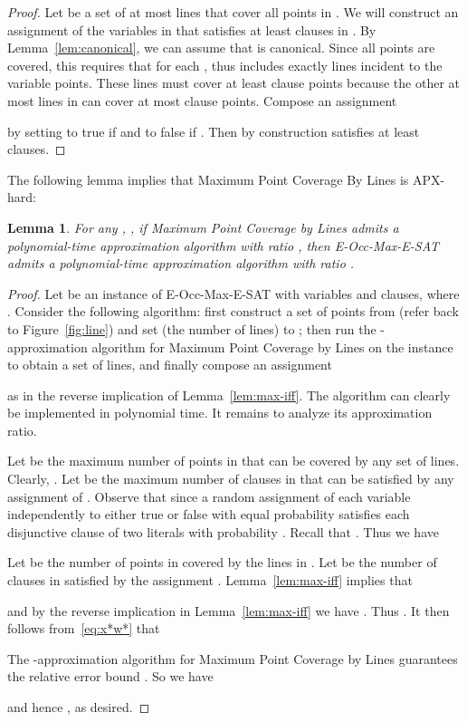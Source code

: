 \documentclass[letterpaper,11pt]{article}
\newtheorem{lemma}{Lemma}
\begin{document}
\begin{proof}
Let  be a set of at most
 lines that cover all points in .
We will construct an assignment of the variables in 
that satisfies at least  clauses in .
By Lemma~\ref{lem:canonical}, we can assume that  is canonical.
Since all points are covered, this requires that  for each
, thus  includes exactly  lines incident to the
variable points. 
These  lines must cover at least  clause points
because the other at most  lines in  can
cover at most  clause points.
Compose an assignment

by setting  to true if 
and to false if .
Then  by construction  satisfies at least  clauses.
\end{proof}

The following lemma implies that {\sc Maximum Point Coverage By Lines} is APX-hard:

\begin{lemma}\label{lem:max}
For any , ,
if {\sc Maximum Point Coverage by Lines} admits a polynomial-time approximation algorithm
with ratio ,
then {\sc E-Occ-Max-E-SAT} admits a polynomial-time approximation algorithm
with ratio .
\end{lemma}

\begin{proof}
Let  be an instance of {\sc E-Occ-Max-E-SAT} with  variables
and  clauses, where .
Consider the following algorithm:
first construct a set  of points from  
(refer back to Figure~\ref{fig:line}) and set
 (the number of lines) to ; 
then run the -approximation algorithm for
{\sc Maximum Point Coverage by Lines}
on the instance  to obtain a set  of lines,
and finally compose an assignment

as in the reverse implication of Lemma~\ref{lem:max-iff}.
The algorithm can clearly be implemented in polynomial time.
It remains to analyze its approximation ratio.

Let  be the maximum number of points in 
that can be covered by any set of  lines.
Clearly, .
Let  be the maximum number of clauses in  that can be satisfied by
any assignment of .
Observe that 
since a random assignment of each variable independently to either true
or false with equal probability  satisfies each disjunctive clause
of two literals with probability .
Recall that .
Thus we have


Let  be the number of points in  covered by the lines in .
Let  be the number of clauses in  satisfied by the assignment .
Lemma~\ref{lem:max-iff} implies that

and by the reverse implication in Lemma~\ref{lem:max-iff} we have 
.
Thus
.
It then follows from~\eqref{eq:x*w*} that

The -approximation algorithm for {\sc Maximum Point Coverage by Lines}
guarantees the relative error bound
.
So we have

and hence , as desired.
\end{proof}
\end{document}
